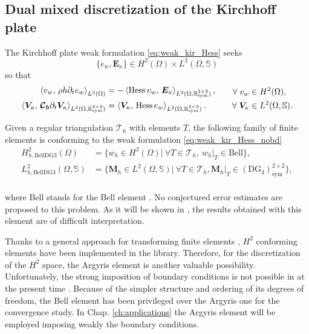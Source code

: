 \subsection{Dual mixed discretization of the Kirchhoff plate}
The Kirchhoff plate weak formulation \eqref{eq:weak_kir_Hess}  seeks
$$\{e_w,\bm{E}_{\kappa}\} \in H^{2}(\Omega) \times L^2(\Omega, \mathbb{S}) $$
so that 
\begin{equation}\label{eq:weak_kir_Hess_nobd}
\begin{aligned}
\inner[L^2(\Omega)]{v_w}{\rho h \partial_t e_w} &= -\inner[L^2(\Omega, \mathbb{R}^{2\times 2}_{\text{sym}})]{\Hess v_w}{\bm{E}_\kappa}, \\
\inner[L^2(\Omega, \mathbb{R}^{2\times 2}_{\text{sym}})]{\bm{V}_\kappa}{\bm{\mathcal{C}_b} \partial_t \bm{V}_\kappa} &= \inner[L^2(\Omega, \mathbb{R}^{2\times 2}_{\text{sym}})]{\bm{V}_\kappa}{\Hess e_w}. \\
\end{aligned} \qquad
\begin{aligned}
\forall \; v_w &\in H^2(\Omega), \\
\forall \; \bm{V}_\kappa &\in L^2(\Omega, \mathbb{S}).
\end{aligned}
\end{equation}


Given a regular triangulation $\mathcal{T}_h$ with elements $T$, the following family of finite elements is conforming to the weak formulation \eqref{eq:weak_kir_Hess_nobd}
\begin{equation}\label{eq:BellDG3}
\begin{aligned}
H_{h, \mathrm{BellDG3}}^{2}(\Omega) &= \{w_h \in H^2(\Omega) \vert \ \forall T \in \mathcal{T}_h, \ w_h|_{T} \in \mathrm{Bell} \}, \\
L_{h, \mathrm{BellDG3}}^2(\Omega, \mathbb{S}) &= \{ \bm{M}_h \in L^2(\Omega, \mathbb{S}) \vert \ \forall T \in \mathcal{T}_h, \bm{M}_h|_{T} \in (\mathrm{DG}_{3})^{2 \times 2}_{\text{sym}} \}, \\
\end{aligned}
\end{equation}

where Bell stands for the Bell element \cite{bell1969}. No conjectured error estimates are proposed to this problem. As it will be shown in , the results obtained with this element are of difficult interpretation.

\begin{remark}\label{rmk:BellArg}
	Thanks to a general approach for transforming finite elements \cite{kirby2018general}, $H^2$ conforming elements have been implemented in the {} library. 	Therefore, for the discretization of the $H^2$ space, the Argyris element \cite{argyris1968} is another valuable possibility.  Unfortunately, the strong imposition of boundary conditions is not possible in {} at the present time \cite[Sec. 3.2]{kirby2019}. Because of the simpler structure and ordering of its degrees of freedom, the Bell element has been privileged over the Argyris one for the convergence study. In Chap. \ref{ch:applications} the Argyris element will be employed imposing weakly the boundary conditions.
\end{remark}

